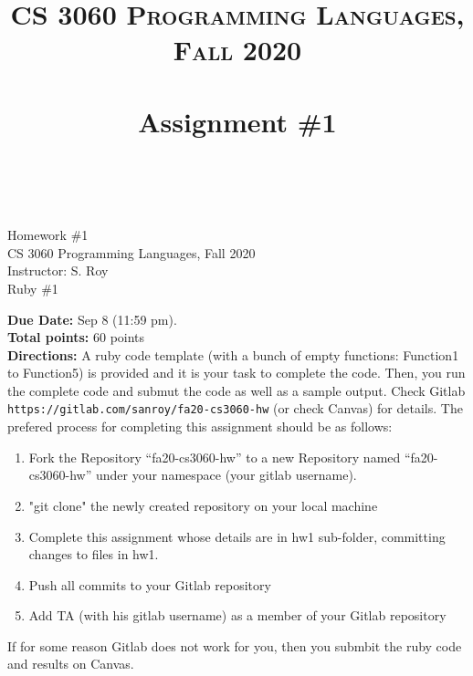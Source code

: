 \documentclass[paper=letter, fontsize=11pt]{scrartcl} %
\title{ 
    \normalfont \normalsize 
    \textsc{CS 3060 Programming Languages, Fall 2020} \\ [25pt] %
    \horrule{0.5pt} \\[0.4cm] %
    \huge Assignment \#1  \\ %
    \horrule{2pt} \\[0.5cm] %
}
\begin{document}
    \begin{center}
         Homework \#1\\
        \small CS 3060 Programming Languages, Fall 2020 \\
        \small Instructor: S. Roy \\
        \huge Ruby \#1
    \end{center}
    
    \textbf{Due Date:}  Sep 8 (11:59 pm).\\

    \textbf{Total points:} 60 points \\

    \textbf{Directions:} A ruby code template (with a bunch of empty functions: Function1 to Function5) is provided and it is your task to complete the code. 
Then, you run the complete code and submut the code as well as a sample output. 
Check Gitlab \@ \texttt{https://gitlab.com/sanroy/fa20-cs3060-hw} (or check Canvas) for details. 
The prefered process for completing this assignment should be as follows:

    \begin{enumerate}[noitemsep]
        \item Fork the Repository ``fa20-cs3060-hw'' to a new Repository named ``fa20-cs3060-hw'' under your namespace (your gitlab username).
        \item "git clone" the newly created repository on your local machine
        \item Complete this assignment whose details are in hw1 sub-folder, committing changes to files in hw1. 
        \item Push all commits to your Gitlab repository
        \item Add TA (with his gitlab username) as a member of your Gitlab repository
    \end{enumerate}

If for some reason Gitlab does not work for you, then you submbit the ruby code and results on Canvas.
\end{document}
